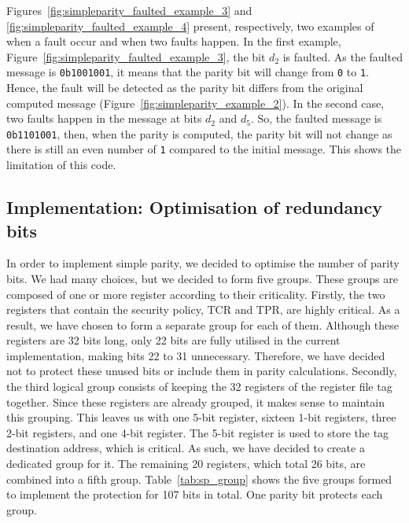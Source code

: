 Figures~\ref{fig:simpleparity_faulted_example_3} and \ref{fig:simpleparity_faulted_example_4} present, respectively, two examples of when a fault occur and when two faults happen.
In the first example, Figure~\ref{fig:simpleparity_faulted_example_3}, the bit $d_2$ is faulted. As the faulted message is \texttt{0b1001001}, it means that the parity bit will change from \texttt{0} to \texttt{1}. Hence, the fault will be detected as the parity bit differs from the original computed message (Figure~\ref{fig:simpleparity_example_2}).
In the second case, two faults happen in the message at bits $d_2$ and $d_5$. So, the faulted message is \texttt{0b1101001}, then, when the parity is computed, the parity bit will not change as there is still an even number of \texttt{1} compared to the initial message. This shows the limitation of this code.

\subsection{Implementation: Optimisation of redundancy bits}

In order to implement simple parity, we decided to optimise the number of parity bits. We had many choices, but we decided to form five groups. These groups are composed of one or more register according to their criticality.
Firstly, the two registers that contain the security policy, TCR and TPR, are highly critical. As a result, we have chosen to form a separate group for each of them. Although these registers are 32 bits long, only 22 bits are fully utilised in the current implementation, making bits 22 to 31 unnecessary. Therefore, we have decided not to protect these unused bits or include them in parity calculations.
Secondly, the third logical group consists of keeping the 32 registers of the register file tag together. Since these registers are already grouped, it makes sense to maintain this grouping.
This leaves us with one 5-bit register, sixteen 1-bit registers, three 2-bit registers, and one 4-bit register. The 5-bit register is used to store the tag destination address, which is critical. As such, we have decided to create a dedicated group for it. The remaining 20 registers, which total 26 bits, are combined into a fifth group.
Table~\ref{tab:sp_group} shows the five groups formed to implement the protection for 107 bits in total. One parity bit protects each group.

